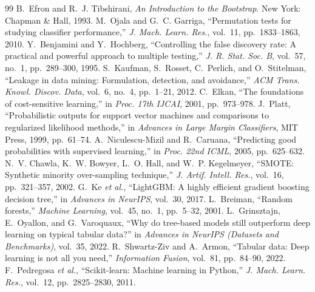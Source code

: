 \documentclass[conference]{IEEEtran}
\begin{document}
\begin{thebibliography}{99}
 B.~Efron and R.~J. Tibshirani, \emph{An Introduction to the Bootstrap}. New York: Chapman \& Hall, 1993.
 M.~Ojala and G.~C. Garriga, ``Permutation tests for studying classifier performance,'' \emph{J. Mach. Learn. Res.}, vol.~11, pp.~1833--1863, 2010.
 Y.~Benjamini and Y.~Hochberg, ``Controlling the false discovery rate: A practical and powerful approach to multiple testing,'' \emph{J. R. Stat. Soc. B}, vol.~57, no.~1, pp.~289--300, 1995.
 S.~Kaufman, S.~Rosset, C.~Perlich, and O.~Stitelman, ``Leakage in data mining: Formulation, detection, and avoidance,'' \emph{ACM Trans. Knowl. Discov. Data}, vol.~6, no.~4, pp.~1--21, 2012.
 C.~Elkan, ``The foundations of cost-sensitive learning,'' in \emph{Proc. 17th IJCAI}, 2001, pp.~973--978.
 J.~Platt, ``Probabilistic outputs for support vector machines and comparisons to regularized likelihood methods,'' in \emph{Advances in Large Margin Classifiers}, MIT Press, 1999, pp.~61--74.
 A.~Niculescu-Mizil and R.~Caruana, ``Predicting good probabilities with supervised learning,'' in \emph{Proc. 22nd ICML}, 2005, pp.~625--632.
 N.~V. Chawla, K.~W. Bowyer, L.~O. Hall, and W.~P. Kegelmeyer, ``SMOTE: Synthetic minority over-sampling technique,'' \emph{J. Artif. Intell. Res.}, vol.~16, pp.~321--357, 2002.
 G.~Ke \emph{et al.}, ``LightGBM: A highly efficient gradient boosting decision tree,'' in \emph{Advances in NeurIPS}, vol.~30, 2017.
 L.~Breiman, ``Random forests,'' \emph{Machine Learning}, vol.~45, no.~1, pp.~5--32, 2001.
 L.~Grinsztajn, E.~Oyallon, and G.~Varoquaux, ``Why do tree-based models still outperform deep learning on typical tabular data?'' in \emph{Advances in NeurIPS (Datasets and Benchmarks)}, vol.~35, 2022.
 R.~Shwartz-Ziv and A.~Armon, ``Tabular data: Deep learning is not all you need,'' \emph{Information Fusion}, vol.~81, pp.~84--90, 2022.
 F.~Pedregosa \emph{et al.}, ``Scikit-learn: Machine learning in Python,'' \emph{J. Mach. Learn. Res.}, vol.~12, pp.~2825--2830, 2011.
\end{thebibliography}
\end{document}
